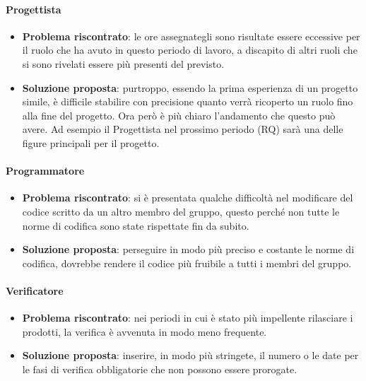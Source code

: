         \paragraph{Progettista}
            \begin{itemize}
                \item \textbf{Problema riscontrato}: le ore assegnategli sono risultate essere eccessive per il ruolo che ha avuto in questo periodo di lavoro, a discapito di altri ruoli che si sono rivelati essere più presenti del previsto.
                \item \textbf{Soluzione proposta}: purtroppo, essendo la prima esperienza di un progetto simile, è difficile stabilire con precisione quanto verrà ricoperto un ruolo fino alla fine del progetto. Ora però è più chiaro l'andamento che questo può avere. Ad esempio il Progettista nel prossimo periodo (RQ) sarà una delle figure principali per il progetto.
            \end{itemize}

        \paragraph{Programmatore}
            \begin{itemize}
                \item \textbf{Problema riscontrato}: si è presentata qualche difficoltà nel modificare del codice scritto da un altro membro del gruppo, questo perché non tutte le norme di codifica sono state rispettate fin da subito.
                \item \textbf{Soluzione proposta}: perseguire in modo più preciso e costante le norme di codifica, dovrebbe rendere il codice più fruibile a tutti i membri del gruppo.
            \end{itemize}

        \paragraph{Verificatore}
            \begin{itemize}
                \item \textbf{Problema riscontrato}: nei periodi in cui è stato più impellente rilasciare i prodotti, la verifica è avvenuta in modo meno frequente.
                \item \textbf{Soluzione proposta}: inserire, in modo più stringete, il numero o le date per le fasi di verifica obbligatorie che non possono essere prorogate.
            \end{itemize}

